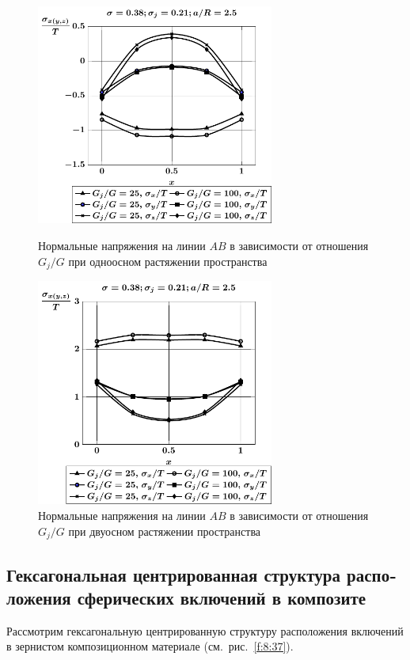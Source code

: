 \begin{russian}
\begin{figure}[h!]
\centering\footnotesize
\parbox[b]{7.5cm}{\centering\includegraphics[width=7.8cm]{inc9-g-a25-d95-t1.pdf}
\caption{Нормальные напряжения на линии  $AB$ в зависимости от отношения $G_j/G$ при одноосном растяжении пространства
\label{f:8:70}}}\hfil\hfil
\parbox[b]{7.5cm}{\centering\includegraphics[width=7.8cm]{inc9-g-a25-d95-t2.pdf}
\caption{Нормальные напряжения на линии  $AB$ в зависимости от отношения $G_j/G$ при двуосном растяжении пространства
\label{f:8:71}}}
\end{figure}

\subsection{Гексагональная центрированная структура расположения сферических включений в композите}

Рассмотрим гексагональную центрированную структуру расположения включений в зернистом композиционном материале (см.~рис.~\ref{f:8:37}).


\end{russian}
